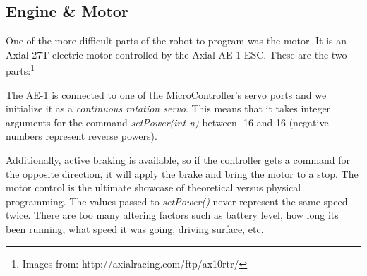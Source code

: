 \documentclass[12pt]{article}
\begin{document}
\clearpage
\subsection{Engine \& Motor}
One of the more difficult parts of the robot to program was the motor.  It is an Axial 27T electric motor controlled by the Axial AE-1 ESC.  These are the two parts:\footnote{Images from: http://axialracing.com/ftp/ax10rtr/}

\begin{figure}[h]
\centering
{}
\hspace{5mm}
\end{figure}

The AE-1 is connected to one of the MicroController's servo ports and we initialize it as a \textit{continuous rotation servo}.  This means that it takes integer arguments for the command \textit{setPower(int n)} between -16 and 16 (negative numbers represent reverse powers).  

Additionally, active braking is available, so if the controller gets a command for the opposite direction, it will apply the brake and bring the motor to a stop.
\vspace{2mm}
The motor control is the ultimate showcase of theoretical versus physical programming.  The values passed to \textit{setPower()} never represent the same speed twice.  There are too many altering factors such as battery level, how long its been running, what speed it was going, driving surface, etc.
\end{document}
